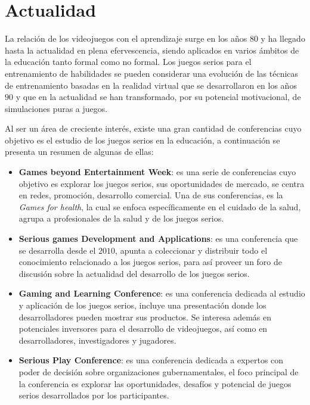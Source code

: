 \section{Actualidad}

La relación de los videojuegos con el aprendizaje surge en los años $80$ y ha
llegado hasta la actualidad en plena efervescencia, siendo aplicados en varios
ámbitos de la educación tanto formal como no formal. Los juegos serios para el
entrenamiento de habilidades se pueden considerar una evolución de las técnicas
de entrenamiento basadas en la realidad virtual que se desarrollaron en los años
$90$ y que en la actualidad se han transformado, por su potencial motivacional,
de simulaciones puras a juegos\cite{videojuegos:gonzaleztardon}.

Al ser un área de creciente interés, existe una gran cantidad de conferencias
cuyo objetivo es el estudio de los juegos serios en la educación, a continuación
se presenta un resumen de algunas de ellas:

\begin{itemize}
\item \textbf{Games beyond Entertainment Week}: es una serie de conferencias
    cuyo objetivo es explorar los juegos serios, sus oportunidades de mercado,
    se centra en redes, promoción, desarrollo comercial. Una de sus
    conferencias, es la \emph{Games for health}, la cual se enfoca
    específicamente en el cuidado de la salud, agrupa a profesionales de la
    salud y de los juegos serios\cite{games_beyond_entertainment}.
\item \textbf{Serious games Development and Applications}: es una conferencia
    que se desarrolla desde el $2010$, apunta a coleccionar y distribuir todo el
    conocimiento relacionado a los juegos serios, para así proveer un foro de
    discusión sobre la actualidad del desarrollo de los juegos
    serios\cite{sgda}.
\item \textbf{Gaming and Learning Conference}: es una conferencia dedicada al
    estudio y aplicación de los juegos serios, incluye una presentación donde
    los desarrolladores pueden mostrar sus productos. Se interesa además en
    potenciales inversores para el desarrollo de videojuegos, así como en
    desarrolladores, investigadores y jugadores\cite{gala}.
\item \textbf{Serious Play Conference}: es una conferencia dedicada a expertos
    con poder de decisión sobre organizaciones gubernamentales, el foco
    principal de la conferencia es explorar las oportunidades, desafíos y
    potencial de juegos serios desarrollados por los
    participantes\cite{seriousplay}.
\end{itemize}

